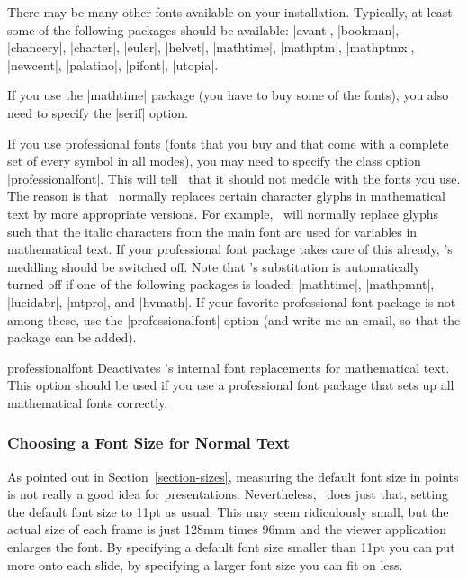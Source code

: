 There may be many other fonts available on your
installation. Typically, at least some of the following packages
should be available: |avant|, |bookman|, |chancery|, |charter|,
|euler|, |helvet|, |mathtime|, |mathptm|, |mathptmx|, |newcent|,
|palatino|, |pifont|, |utopia|.

If you use the |mathtime| package (you have to buy some of the fonts),
you also need to specify the |serif| option.

If you use professional fonts (fonts that you buy and that come with a
complete set of every symbol in all modes), you may need to specify the
class option |professionalfont|. This will tell \beamer\ that it
should not meddle with the fonts you use. The reason is that \beamer\ 
normally replaces certain character glyphs in mathematical text by
more appropriate versions. For example, \beamer\ will normally replace
glyphs such that the italic characters from the main font are used for
variables in mathematical text. If your professional font package
takes care of this already, \beamer's meddling should be switched
off. Note that \beamer's substitution is automatically turned off if
one of the following packages is loaded: |mathtime|, |mathpmnt|,
|lucidabr|, |mtpro|, and |hvmath|. If your favorite professional font
package is not among these, use the |professionalfont| option (and
write me an email, so that the package can be added).

\begin{classoption}{professionalfont}
  Deactivates \beamer's internal font replacements for mathematical
  text. This option should be used if you use a professional font
  package that sets up all mathematical fonts correctly.
\end{classoption}





\subsubsection{Choosing a Font Size for Normal Text}

As pointed out in Section~\ref{section-sizes}, measuring the default
font size in points is not really a good idea for
presentations. Nevertheless, \beamer\ does just that, setting the
default font size to 11pt as usual. This may seem ridiculously small, but 
the actual size of each frame is just 128mm times 96mm and the viewer
application enlarges the font. By specifying a default font size
smaller than 11pt you can put more onto each slide, by specifying a
larger font size you can fit on less.

